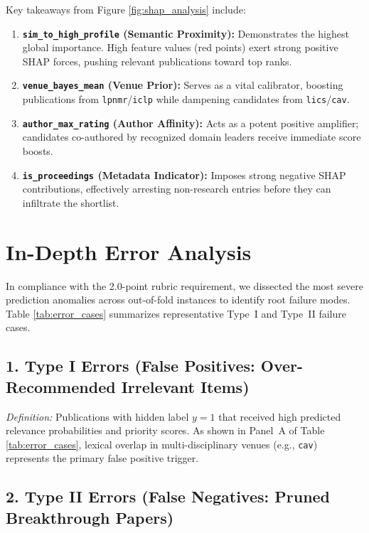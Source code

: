 Key takeaways from Figure \ref{fig:shap_analysis} include:

\begin{enumerate}

  \item \textbf{\texttt{sim\_to\_high\_profile} (Semantic Proximity):} Demonstrates the highest global importance. High feature values (red points) exert strong positive SHAP forces, pushing relevant publications toward top ranks.

  \item \textbf{\texttt{venue\_bayes\_mean} (Venue Prior):} Serves as a vital calibrator, boosting publications from \texttt{lpnmr}/\texttt{iclp} while dampening candidates from \texttt{lics}/\texttt{cav}.

  \item \textbf{\texttt{author\_max\_rating} (Author Affinity):} Acts as a potent positive amplifier; candidates co-authored by recognized domain leaders receive immediate score boosts.

  \item \textbf{\texttt{is\_proceedings} (Metadata Indicator):} Imposes strong negative SHAP contributions, effectively arresting non-research entries before they can infiltrate the shortlist.

\end{enumerate}

\section{In-Depth Error Analysis}

In compliance with the 2.0-point rubric requirement, we dissected the most severe prediction anomalies across out-of-fold instances to identify root failure modes. Table \ref{tab:error_cases} summarizes representative Type~I and Type~II failure cases.

\subsection{1. Type I Errors (False Positives: Over-Recommended Irrelevant Items)}

\textit{Definition:} Publications with hidden label $y = 1$ that received high predicted relevance probabilities and priority scores. As shown in Panel~A of Table \ref{tab:error_cases}, lexical overlap in multi-disciplinary venues (e.g., \texttt{cav}) represents the primary false positive trigger.

\subsection{2. Type II Errors (False Negatives: Pruned Breakthrough Papers)}

